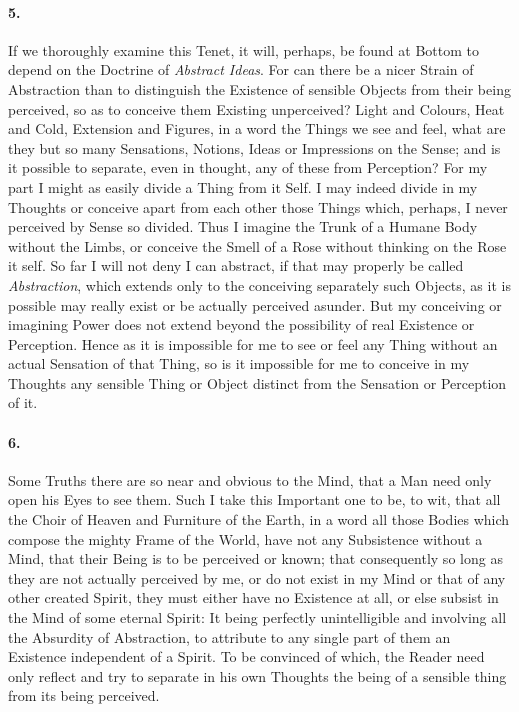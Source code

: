 \documentclass[]{article}
\newenvironment{sectionbody}{}{}
\begin{document}
\begin{sectionbody}
\paragraph{5.} If we thoroughly examine this Tenet, it will, perhaps, be found
at Bottom to depend on the Doctrine of \emph{Abstract Ideas}.  For
can there be a nicer Strain of Abstraction than to distinguish
the Existence of sensible Objects from their being perceived, so
as to conceive them Existing unperceived? Light and Colours, Heat
and Cold, Extension and Figures, in a word the Things we see and
feel, what are they but so many Sensations, Notions, Ideas or
Impressions on the Sense; and is it possible to separate, even in
thought, any of these from Perception? For my part I might as
easily divide a Thing from it Self.  I may indeed divide in my
Thoughts or conceive apart from each other those Things which,
perhaps, I never perceived by Sense so divided.  Thus I imagine
the Trunk of a Humane Body without the Limbs, or conceive the
Smell of a Rose without thinking on the Rose it self.  So far I
will not deny I can abstract, if that may properly be called
\emph{Abstraction}, which extends only to the conceiving
separately such Objects, as it is possible may really exist or be
actually perceived asunder.  But my conceiving or imagining Power
does not extend beyond the possibility of real Existence or
Perception.  Hence as it is impossible for me to see or feel any
Thing without an actual Sensation of that Thing, so is it
impossible for me to conceive in my Thoughts any sensible Thing
or Object distinct from the Sensation or Perception of it.



\paragraph{6.} Some Truths there are so near and obvious to the Mind, that a Man
need only open his Eyes to see them.  Such I take this Important
one to be, to wit, that all the Choir of Heaven and Furniture of
the Earth, in a word all those Bodies which compose the mighty
Frame of the World, have not any Subsistence without a Mind, that
their Being is to be perceived or known; that consequently so
long as they are not actually perceived by me, or do not exist in
my Mind or that of any other created Spirit, they must either
have no Existence at all, or else subsist in the Mind of some
eternal Spirit: It being perfectly unintelligible and involving
all the Absurdity of Abstraction, to attribute to any single part
of them an Existence independent of a Spirit.  To be convinced of
which, the Reader need only reflect and try to separate in his
own Thoughts the being of a sensible thing from its being
perceived.




\end{sectionbody}
\end{document}
